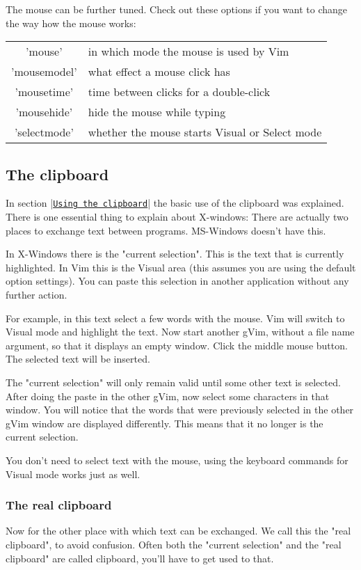 The mouse can be further tuned.
Check out these options if you want to change the way how the mouse works:

\begin{center}\begin{longtable}{c l}
				'mouse' & in which mode the mouse is used by Vim \\
				'mousemodel' & what effect a mouse click has \\
				'mousetime' & time between clicks for a double-click \\
				'mousehide' & hide the mouse while typing \\
				'selectmode' & whether the mouse starts Visual or Select mode \\
\end{longtable}\end{center}
\subsection{The clipboard}
In section |\hyperref[Using the clipboard]{\texttt{Using the clipboard}}| the basic use of the clipboard was explained.
There is one essential thing to explain about X-windows: There are actually two places to exchange text between programs.
MS-Windows doesn't have this.

In X-Windows there is the "current selection".
This is the text that is currently highlighted.
In Vim this is the Visual area (this assumes you are using the default option settings).
You can paste this selection in another application without any further action.

For example, in this text select a few words with the mouse.
Vim will switch to Visual mode and highlight the text.
Now start another gVim, without a file name argument, so that it displays an empty window.
Click the middle mouse button.
The selected text will be inserted.

The "current selection" will only remain valid until some other text is selected.
After doing the paste in the other gVim, now select some characters in that window.
You will notice that the words that were previously selected in the other gVim window are displayed differently.
This means that it no longer is the current selection.

You don't need to select text with the mouse, using the keyboard commands for Visual mode works just as well.
\subsubsection{The real clipboard}
Now for the other place with which text can be exchanged.
We call this the "real clipboard", to avoid confusion.
Often both the "current selection" and the "real clipboard" are called clipboard, you'll have to get used to that.

